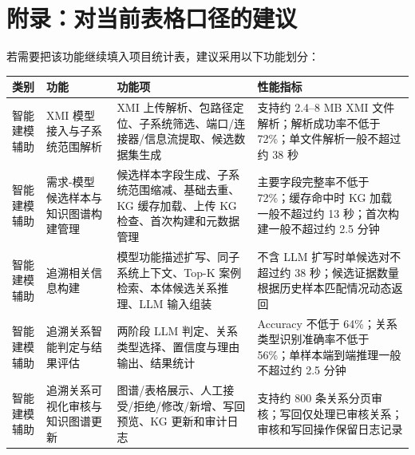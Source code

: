 \documentclass[11pt,a4paper]{article}
\begin{document}
\section{附录：对当前表格口径的建议}

若需要把该功能继续填入项目统计表，建议采用以下功能划分：

\begin{longtable}{p{}p{}p{}p{}}
\toprule
\textbf{类别} & \textbf{功能} & \textbf{功能项} & \textbf{性能指标} \\
\midrule
智能建模辅助 & XMI 模型接入与子系统范围解析 & XMI 上传解析、包路径定位、子系统筛选、端口/连接器/信息流提取、候选数据集生成 & 支持约 2.4--8 MB XMI 文件解析；解析成功率不低于 72\%；单文件解析一般不超过约 38 秒 \\
智能建模辅助 & 需求-模型候选样本与知识图谱构建管理 & 候选样本字段生成、子系统范围缩减、基础去重、KG 缓存加载、上传 KG 检查、首次构建和元数据管理 & 主要字段完整率不低于 72\%；缓存命中时 KG 加载一般不超过约 13 秒；首次构建一般不超过约 2.5 分钟 \\
智能建模辅助 & 追溯相关信息构建 & 模型功能描述扩写、同子系统上下文、Top-K 案例检索、本体候选关系推理、LLM 输入组装 & 不含 LLM 扩写时单候选对不超过约 38 秒；候选证据数量根据历史样本匹配情况动态返回 \\
智能建模辅助 & 追溯关系智能判定与结果评估 & 两阶段 LLM 判定、关系类型选择、置信度与理由输出、结果统计 & Accuracy 不低于 64\%；关系类型识别准确率不低于 56\%；单样本端到端推理一般不超过约 2.5 分钟 \\
智能建模辅助 & 追溯关系可视化审核与知识图谱更新 & 图谱/表格展示、人工接受/拒绝/修改/新增、写回预览、KG 更新和审计日志 & 支持约 800 条关系分页审核；写回仅处理已审核关系；审核和写回操作保留日志记录 \\
\bottomrule
\end{longtable}
\end{document}
